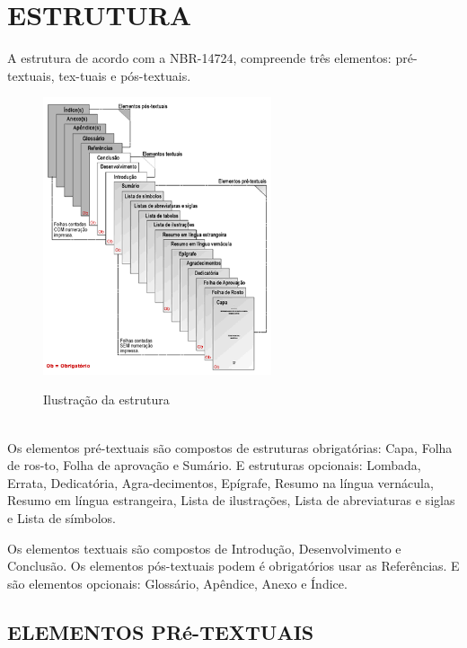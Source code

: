 %
%

\chapter{ESTRUTURA}

A estrutura de acordo com a NBR-14724, compreende tr\^{e}s elementos: pr\'{e}-textuais, tex-tuais e p\'{o}s-textuais.

\begin{figure}[H]
	\vspace*{0,2cm}
    \centering
    \caption{Ilustra\c{c}ão da estrutura}
    \includegraphics[width=0.6\textwidth]{./04-figuras/abnt}
    \label{fig:ilustfig2}
\end{figure}
\vspace*{-0,9cm}
{\raggedright {}}\\

Os elementos pr\'{e}-textuais são compostos de estruturas
obrigat\'{o}rias: Capa, Folha de ros-to, Folha de aprova\c{c}ão e Sumário. E estruturas opcionais: Lombada, Errata, Dedicat\'{o}ria, Agra-decimentos, Epígrafe, Resumo na língua vernácula, Resumo em língua estrangeira, Lista de ilustra\c{c}ões, Lista de abreviaturas e siglas e Lista de símbolos.

Os elementos textuais são compostos de Introdu\c{c}ão,
Desenvolvimento e Conclusão. Os elementos p\'{o}s-textuais podem \'{e} obrigat\'{o}rios usar as Refer\^{e}ncias.  E são elementos opcionais: Glossário, Ap\^{e}ndice, Anexo e Índice.

\section{ELEMENTOS PR\'{e}-TEXTUAIS}

